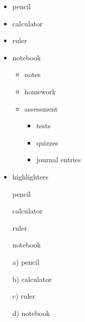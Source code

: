 \documentclass[11pt]{article}
\begin{document}
\pagebreak

\begin{itemize}
\item pencil
\item calculator
\item ruler
\item notebook
	\begin{itemize}
	\item notes
	\item homework
	\item assessment
		\begin{itemize}
		\item tests
		\item quizzes
		\item journal entries
		\end{itemize}
	\end{itemize}
\item highlighters
\end{itemize}

\vspace{1cm}

\begin{enumerate}  %
\item[] pencil
\item[] calculator
\item[] ruler
\item[] notebook
\end{enumerate}

\vspace{1cm}

\begin{enumerate}  %
\item[a)] pencil
\item[b)] calculator
\item[c)] ruler
\item[d)] notebook
\end{enumerate}
\end{document}
